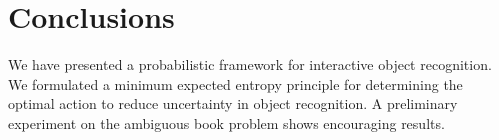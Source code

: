 \section{Conclusions}

We have presented a probabilistic framework for interactive object recognition. We formulated a minimum expected entropy principle for determining the optimal action to reduce uncertainty in object recognition. A preliminary experiment on the ambiguous book problem shows encouraging results.


   